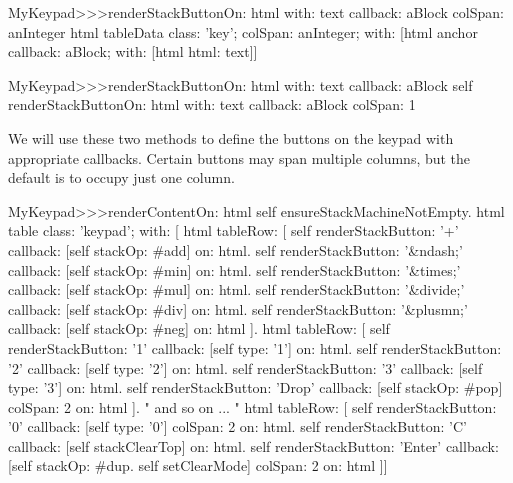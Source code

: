 \documentclass[a4paper,10pt,twoside]{book}
\begin{document}

\begin{code}{}
MyKeypad>>>renderStackButtonOn: html with: text callback: aBlock colSpan: anInteger 
	html tableData
		class: 'key';
		colSpan: anInteger;
		with: 
			[html anchor
				callback: aBlock;
				with: [html html: text]]
\end{code}


\begin{code}{}
MyKeypad>>>renderStackButtonOn: html with: text callback: aBlock 
	self 
		renderStackButtonOn: html
		with: text
		callback: aBlock
		colSpan: 1
\end{code}

We will use these two methods to define the buttons on the keypad with appropriate callbacks.
Certain buttons may span multiple columns, but the default is to occupy just one column.


\begin{code}{}
MyKeypad>>>renderContentOn: html 
  self ensureStackMachineNotEmpty.
  html table
    class: 'keypad';
    with: [
      html tableRow: [
          self renderStackButton: '+' callback: [self stackOp: #add] on: html.
          self renderStackButton: '&ndash;' callback: [self stackOp: #min] on: html.
          self renderStackButton: '&times;' callback: [self stackOp: #mul] on: html.
          self renderStackButton: '&divide;' callback: [self stackOp: #div] on: html.
          self renderStackButton: '&plusmn;' callback: [self stackOp: #neg] on: html ].
        html tableRow: [
          self renderStackButton: '1' callback: [self type: '1'] on: html.
          self renderStackButton: '2' callback: [self type: '2'] on: html.
          self renderStackButton: '3' callback: [self type: '3'] on: html.
          self renderStackButton: 'Drop' callback: [self stackOp: #pop]
          	colSpan: 2 on: html ].
" and so on ... "
        html tableRow: [
          self renderStackButton: '0' callback: [self type: '0'] colSpan: 2 on: html.
          self renderStackButton: 'C' callback: [self stackClearTop] on: html.
          self renderStackButton: 'Enter'
          	callback: [self stackOp: #dup. self setClearMode]
			colSpan: 2 on: html ]]
\end{code}
\end{document}
